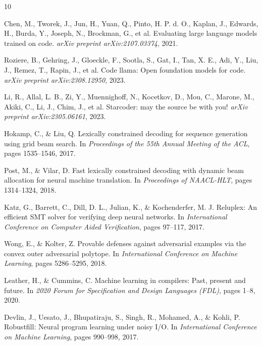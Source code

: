 \documentclass[11pt,a4paper]{article}
\begin{document}
\begin{thebibliography}{10}

Chen, M., Tworek, J., Jun, H., Yuan, Q., Pinto, H. P. d. O., Kaplan, J., Edwards, H., Burda, Y., Joseph, N., Brockman, G., et al.
\newblock Evaluating large language models trained on code.
\newblock \textit{arXiv preprint arXiv:2107.03374}, 2021.

Roziere, B., Gehring, J., Gloeckle, F., Sootla, S., Gat, I., Tan, X. E., Adi, Y., Liu, J., Remez, T., Rapin, J., et al.
\newblock Code llama: Open foundation models for code.
\newblock \textit{arXiv preprint arXiv:2308.12950}, 2023.

Li, R., Allal, L. B., Zi, Y., Muennighoff, N., Kocetkov, D., Mou, C., Marone, M., Akiki, C., Li, J., Chim, J., et al.
\newblock Starcoder: may the source be with you!
\newblock \textit{arXiv preprint arXiv:2305.06161}, 2023.

Hokamp, C., \& Liu, Q.
\newblock Lexically constrained decoding for sequence generation using grid beam search.
\newblock In \textit{Proceedings of the 55th Annual Meeting of the ACL}, pages 1535--1546, 2017.

Post, M., \& Vilar, D.
\newblock Fast lexically constrained decoding with dynamic beam allocation for neural machine translation.
\newblock In \textit{Proceedings of NAACL-HLT}, pages 1314--1324, 2018.

Katz, G., Barrett, C., Dill, D. L., Julian, K., \& Kochenderfer, M. J.
\newblock Reluplex: An efficient SMT solver for verifying deep neural networks.
\newblock In \textit{International Conference on Computer Aided Verification}, pages 97--117, 2017.

Wong, E., \& Kolter, Z.
\newblock Provable defenses against adversarial examples via the convex outer adversarial polytope.
\newblock In \textit{International Conference on Machine Learning}, pages 5286--5295, 2018.

Leather, H., \& Cummins, C.
\newblock Machine learning in compilers: Past, present and future.
\newblock In \textit{2020 Forum for Specification and Design Languages (FDL)}, pages 1--8, 2020.

Devlin, J., Uesato, J., Bhupatiraju, S., Singh, R., Mohamed, A., \& Kohli, P.
\newblock Robustfill: Neural program learning under noisy I/O.
\newblock In \textit{International Conference on Machine Learning}, pages 990--998, 2017.


\end{thebibliography}
\end{document}
